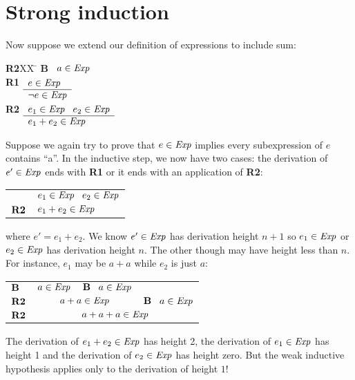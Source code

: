 \documentclass[12pt]{article}
\newcommand{\id}[1]{\mbox{\it #1\/}}
\newcommand{\bid}[1]{\mbox{\bf #1}}
\begin{document}
\section{Strong induction}

Now suppose we extend our definition of expressions to include sum:
\begin{tabbing}
{\bf R2}XX \=  \kill
{\bf B} \>
	\(\begin{array}[t]{l}
	a\in\id{Exp}
	\end{array}\) \\[2ex]
{\bf R1} \>
	\(\begin{array}[t]{l}
	e\in\id{Exp} \\
	\hline
	\neg e\in\id{Exp}
	\end{array}\) \\[2ex]
{\bf R2} \>
	\(\begin{array}[t]{l}
	e_1\in\id{Exp}\;\;\;e_2\in\id{Exp} \\
	\hline
	e_1 + e_2\in\id{Exp}
	\end{array}\) %
\end{tabbing}
Suppose we again try to prove that $e\in\id{Exp}$ implies every subexpression of $e$ contains ``a''.
In the inductive step, we now have two cases:
the derivation of $e'\in\id{Exp}$ ends with {\bf R1} or it ends with an application of {\bf R2}:
\begin{center}
\begin{tabular}{ll}
 & $e_1\in\id{Exp}\;\;\; e_2\in\id{Exp}$ \\ \cline{2-2}
$\bid{R2}$ & $e_1+e_2\in\id{Exp}$ 
\end{tabular}
\end{center}
where $e' = e_1 + e_2$.
We know $e'\in\id{Exp}$ has derivation height $n+1$ so $e_1\in\id{Exp}$ or $e_2\in\id{Exp}$ 
has derivation height $n$.
The other though may have height less than $n$.
For instance, $e_1$ may be $a+a$ while $e_2$ is just $a$:
\begin{center}
\begin{tabular}{llll}
$\bid{B}$ & $a\in\id{Exp}$ & $\bid{B}\;\;\;a\in\id{Exp}$ \\ \cline{2-3}
$\bid{R2}$ & \multicolumn{2}{c}{$a+a\in\id{Exp}$} & $\bid{B}\;\;\;a\in\id{Exp}$ \\ \cline{2-4}
$\bid{R2}$ & \multicolumn{3}{c}{$a+a+a\in\id{Exp}$} 
\end{tabular}
\end{center}
The derivation of $e_1+e_2\in\id{Exp}$ has height 2, 
the derivation of $e_1\in\id{Exp}$ has height 1 and the derivation of
$e_2\in\id{Exp}$ has height zero.
But the weak inductive hypothesis applies only to the derivation of height $1$!
\end{document}
